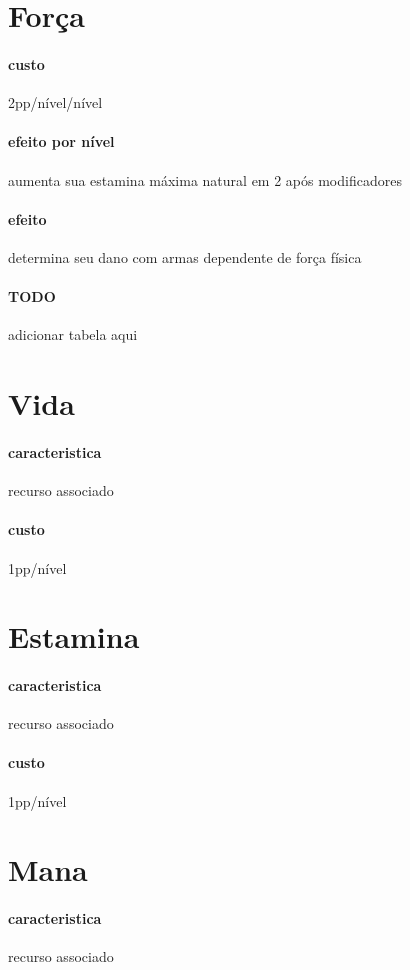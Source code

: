 \section{Força}
\paragraph{custo} 2pp/nível/nível
\paragraph{efeito por nível} aumenta sua estamina máxima natural em 2 após modificadores
\paragraph{efeito} determina seu dano com armas dependente de força física
\paragraph{TODO} adicionar tabela aqui
%
%
\section{Vida}
\paragraph{caracteristica} recurso associado
\paragraph{custo} 1pp/nível
%
%
\section{Estamina}
\paragraph{caracteristica} recurso associado
\paragraph{custo} 1pp/nível
%
%
\section{Mana}
\paragraph{caracteristica} recurso associado
